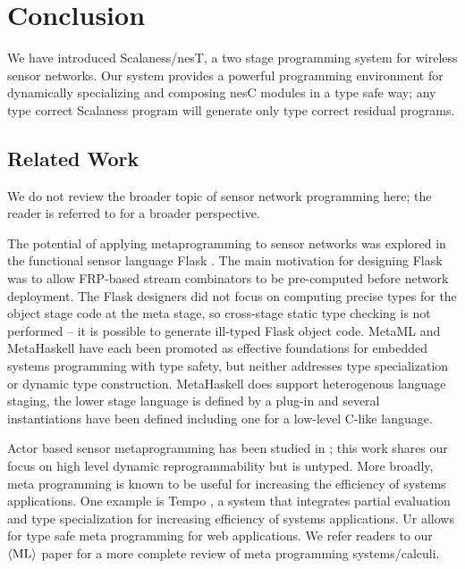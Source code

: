 \section{Conclusion}
\label{section-conclusion}

We have introduced Scalaness/nesT, a two stage programming system for wireless sensor networks.
Our system provides a powerful programming environment for dynamically specializing and
composing nesC modules in a type safe way; any type correct Scalaness program will generate only
type correct residual programs.

\subsection{Related Work}
We do not review the broader topic of sensor network programming here; the reader is referred to
\cite{Mottola:2011:PWS:1922649.1922656} for a broader perspective.

The potential of applying metaprogramming to sensor networks was explored in the functional
sensor language Flask \cite{Mainland-Flask-2008}. The main motivation for designing Flask was to
allow FRP-based
stream combinators to be pre-computed before network deployment. The Flask designers did not
focus on computing precise types for the object stage code at the meta stage, so cross-stage
static type checking is not performed -- it is possible to generate ill-typed Flask object code.
MetaML \cite{Taha-MetaML,DBLP:conf/icess/Taha04} and MetaHaskell \cite{mainland12} have each
been promoted as effective foundations for embedded systems programming with type safety, but
neither addresses type specialization or dynamic type construction. MetaHaskell does support
heterogenous language staging, the lower stage language is defined by a plug-in and several
instantiations have been defined including one for a low-level C-like language.

Actor based sensor metaprogramming has been studied in \cite{cheong07}; this work shares our
focus on high level dynamic reprogrammability but is untyped. More broadly, meta programming is
known to be useful for increasing the efficiency of systems applications. One example is Tempo
\cite{289140}, a system that integrates partial evaluation and type specialization for
increasing efficiency of systems applications. Ur \cite{UrPLDI10} allows for type safe meta
programming for web applications. We refer readers to our $\langle \textrm{ML} \rangle$ paper
\cite{FramedML} for a more complete review of meta programming systems/calculi.

